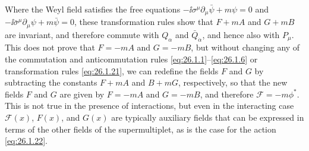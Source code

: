 Where the Weyl field satisfies the free equations
\(-\ii\sigma^\mu\partial_\mu\bar\psi+m\psi=0\) and
\(-\ii\bar\sigma^\mu\partial_\mu\psi+m\bar\psi=0\), these transformation
rules show that
\(F+mA\) and \(G+mB\) are invariant, and therefore commute with
\(Q_\alpha\) and \(\bar Q_{\dot\alpha}\), and hence also with \(P_\mu\).
This does not
prove that \(F=-mA\) and \(G=-mB\), but without changing any of the
commutation and anticommutation rules
\eqref{eq:26.1.1}--\eqref{eq:26.1.6} or transformation rules
\eqref{eq:26.1.21}, we can redefine the fields \(F\) and \(G\) by subtracting
the constants \(F+mA\) and \(B+mG\), respectively, so that the new fields
\(F\) and \(G\) are given by \(F=-mA\) and \(G=-mB\), and therefore
\(\mathcal{F}=-m\phi^*\). This is not true in the presence of interactions,
but even in the interacting case \(\mathcal{F}(x)\), \(F(x)\), and \(G(x)\)
are typically auxiliary fields that can be expressed in terms of the other
fields of the supermultiplet, as is the case for the action
\eqref{eq:26.1.22}.
